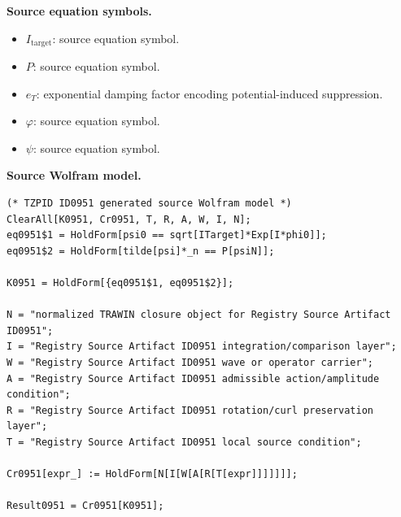 \begin{minipage}[t]{0.49\linewidth}
\begingroup
\small
\raggedright
\textbf{Source equation symbols.}\par
\begin{itemize}[leftmargin=1.35em,itemsep=1pt,topsep=1pt,parsep=0pt]
    \item $I_{\mathrm{target}}$: source equation symbol.
    \item $P$: source equation symbol.
    \item $e_T$: exponential damping factor encoding potential-induced suppression.
    \item $\varphi$: source equation symbol.
    \item $\psi$: source equation symbol.
\end{itemize}
\endgroup
\end{minipage}\hfill
\begin{minipage}[t]{0.47\linewidth}
\begingroup
\scriptsize
\raggedright
\textbf{Source Wolfram model.}\par
\begin{Verbatim}[fontsize=\tiny,breaklines=true,breakanywhere=true]
(* TZPID ID0951 generated source Wolfram model *)
ClearAll[K0951, Cr0951, T, R, A, W, I, N];
eq0951$1 = HoldForm[psi0 == sqrt[ITarget]*Exp[I*phi0]];
eq0951$2 = HoldForm[tilde[psi]*_n == P[psiN]];

K0951 = HoldForm[{eq0951$1, eq0951$2}];

N = "normalized TRAWIN closure object for Registry Source Artifact ID0951";
I = "Registry Source Artifact ID0951 integration/comparison layer";
W = "Registry Source Artifact ID0951 wave or operator carrier";
A = "Registry Source Artifact ID0951 admissible action/amplitude condition";
R = "Registry Source Artifact ID0951 rotation/curl preservation layer";
T = "Registry Source Artifact ID0951 local source condition";

Cr0951[expr_] := HoldForm[N[I[W[A[R[T[expr]]]]]]];

Result0951 = Cr0951[K0951];
\end{Verbatim}
\endgroup
\end{minipage}

